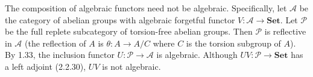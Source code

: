 The composition of algebraic functors need not be algebraic. Specifically, let $\mathcal{A}$ be the category of abelian groups with algebraic forgetful functor $V: \mathcal{A} \longrightarrow \mathbf{Set}$. Let $\mathcal{P}$ be the full replete subcategory of torsion-free abelian groups. Then $\mathcal{P}$ is reflective in $\mathcal{A}$ (the reflection of $A$ is $\theta: A \longrightarrow A/C$ where $C$ is the torsion subgroup of $A$). By 1.33, the inclusion functor $U: \mathcal{P} \longrightarrow \mathcal{A}$ is algebraic. Although $UV: \mathcal{P} \longrightarrow \mathbf{Set}$ has a left adjoint (2.2.30), $UV$ is not algebraic.
